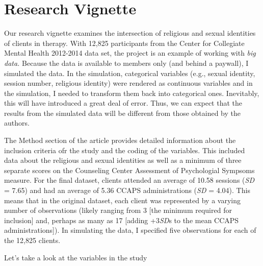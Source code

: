 \documentclass[
  english,
]{book}
\begin{document}
\hypertarget{research-vignette-3}{%
\section{Research Vignette}\label{research-vignette-3}}

Our research vignette \citep{lefevor_religious_2017} examines the intersection of religious and sexual identities of clients in therapy. With 12,825 participants from the Center for Collegiate Mental Health 2012-2014 data set, the project is an example of working with \emph{big data.} Because the data is available to members only (and behind a paywall), I simulated the data. In the simulation, categorical variables (e.g., sexual identity, session number, religious identity) were rendered as continuous variables and in the simulation, I needed to transform them back into categorical ones. Inevitably, this will have introduced a great deal of error. Thus, we can expect that the results from the simulated data will be different from those obtained by the authors.

The Method section of the article provides detailed information about the inclusion criteria ofr the study and the coding of the variables. This included data about the religious and sexual identities as well as a minimum of three separate scores on the Counseling Center Assessment of Psychologial Sympsoms \citep[CCAPS,][]{locke_development_2012} measure. For the final dataset, clients attended an average of 10.58 sessions (\emph{SD} = 7.65) and had an average of 5.36 CCAPS administrations (\emph{SD} = 4.04). This means that in the original dataset, each client was represented by a varying number of observations (likely ranging from 3 {[}the minimum required for inclusion{]} and, perhaps as many as 17 {[}adding +3\emph{SD}s to the mean CCAPS administrations{]}). In simulating the data, I specified five observations for each of the 12,825 clients.

Let's take a look at the variables in the study
\end{document}
